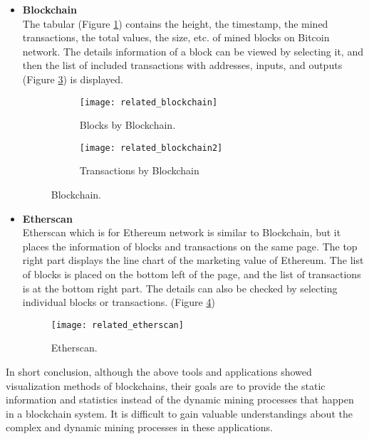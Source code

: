 \begin{itemize}
    \item \textbf{Blockchain} \cite{blockchain} \\
        The tabular (Figure \ref{fig:blocks by blockchain}) contains the height, the timestamp, the mined transactions, the total values, the size, etc. of mined blocks on Bitcoin network. The details information of a block can be viewed by selecting it, and then the list of included transactions with addresses, inputs, and outputs (Figure \ref{fig:transactions by blockchain}) is displayed.

        \begin{figure}[htb]
            \centering
            \begin{subfigure}[b]{1\textwidth}
                \centering
                \texttt{[image: related\_blockchain]}
                \caption{Blocks by Blockchain.}
                \label{fig:blocks by blockchain}
            \end{subfigure}

            \begin{subfigure}[b]{1\textwidth}
                \centering
                \texttt{[image: related\_blockchain2]}
                \caption{Transactions by Blockchain}
                \label{fig:transactions by blockchain}
            \end{subfigure}

            \caption{Blockchain.}
        \end{figure}
    \item \textbf{Etherscan} \cite{etherscan} \\
        Etherscan which is for Ethereum network is similar to Blockchain, but it places the information of blocks and transactions on the same page. The top right part displays the line chart of the marketing value of Ethereum. The list of blocks is placed on the bottom left of the page, and the list of transactions is at the bottom right part. The details can also be checked by selecting individual blocks or transactions. (Figure \ref{fig:etherscan})
        \begin{figure}[htb]
            \centering
            \texttt{[image: related\_etherscan]}
            \caption{Etherscan.}
            \label{fig:etherscan}
        \end{figure}
\end{itemize}

In short conclusion, although the above tools and applications showed visualization methods of blockchains, their goals are to provide the static information and statistics instead of the dynamic mining processes that happen in a blockchain system. It is difficult to gain valuable understandings about the complex and dynamic mining processes in these applications.

